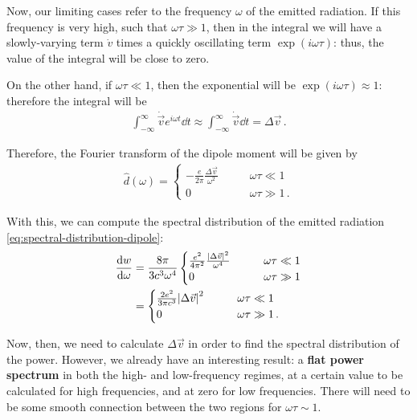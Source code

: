 \documentclass[main.tex]{subfiles}
\begin{document}
Now, our limiting cases refer to the frequency \(\omega \) of the emitted radiation. 
If this frequency is very high, such that \(\omega \tau \gg 1\), then in the integral we will have a slowly-varying term \(\dot{v}\) times a quickly oscillating term \(\exp(i \omega \tau )\): thus, the value of the integral will be close to zero. 

On the other hand, if \(\omega \tau \ll 1\), then the exponential will be \(\exp(i \omega \tau ) \approx 1\): therefore the integral will be 
%
\begin{align}
\int_{-\infty}^{\infty } \dot{\vec{v}} e^{i \omega t}\dd{t} \approx 
\int_{-\infty}^{\infty } \dot{\vec{v}} \dd{t} = \Delta \vec{v}
\,.
\end{align}

Therefore, the Fourier transform of the dipole moment will be given by 
%
\begin{align}
\hat{d}(\omega ) = 
\begin{cases}
    - \frac{e}{2 \pi } \frac{\Delta \vec{v}}{\omega^2} &\qquad \omega \tau \ll 1  \\
    0 &\qquad \omega \tau \gg 1\,.
\end{cases}
\end{align}

With this, we can compute the spectral distribution of the emitted radiation \eqref{eq:spectral-distribution-dipole}: 
%
\begin{align}
\dv{w}{\omega } 
&= \frac{8 \pi }{3 c^3 \omega^{4}}
\begin{cases}
    \frac{e^2}{4 \pi^2 } \frac{\abs{\Delta \vec{v}}^2}{\omega^4} &\qquad \omega \tau \ll 1  \\
    0 &\qquad \omega \tau \gg 1
\end{cases}
\\
&= 
\begin{cases}
    \frac{2e^2}{3 \pi c^3 } \abs{\Delta \vec{v}}^2 &\qquad \omega \tau \ll 1  \\
    0 &\qquad \omega \tau \gg 1\,.
\end{cases}
\end{align}

Now, then, we need to calculate \(\Delta \vec{v}\) in order to find the spectral distribution of the power. However, we already have an interesting result: a \textbf{flat power spectrum} in both the high- and low-frequency regimes, at a certain value to be calculated for high frequencies, and at zero for low frequencies. 
There will need to be some smooth connection between the two regions for \(\omega \tau \sim 1 \). 
\end{document}
